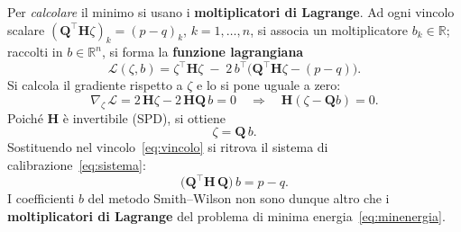 \documentclass[11pt,a4paper]{article}
\theoremstyle{plain}
\theoremstyle{definition}
\theoremstyle{remark}
\newcommand{\Qmat}{\mathbf{Q}}
\newcommand{\Hmat}{\mathbf{H}}
\newcommand{\transp}{^{\!\top}}
\begin{document}
Per \emph{calcolare} il minimo si usano i \textbf{moltiplicatori di Lagrange}.
Ad ogni vincolo scalare $(\Qmat\transp\Hmat\zeta)_k = (p-q)_k$, $k=1,\ldots,n$,
si associa un moltiplicatore $b_k\in\mathbb{R}$; raccolti in $b\in\mathbb{R}^n$, si forma la
\textbf{funzione lagrangiana}
\begin{equation}
  \mathcal{L}(\zeta,b)
  = \zeta\transp\Hmat\zeta
    \;-\; 2\,b\transp\!\bigl(\Qmat\transp\Hmat\zeta - (p-q)\bigr).
  \label{eq:lagrangiana}
\end{equation}
Si calcola il gradiente rispetto a $\zeta$ e lo si pone uguale a zero:
\[
  \nabla_\zeta\,\mathcal{L}
  = 2\,\Hmat\zeta - 2\,\Hmat\Qmat\,b = 0
  \quad\Longrightarrow\quad
  \Hmat(\zeta - \Qmat b) = 0.
\]
Poich\'e $\Hmat$ \`e invertibile (SPD), si ottiene
\[
  \zeta = \Qmat\, b .
\]
Sostituendo nel vincolo~\eqref{eq:vincolo} si ritrova il sistema di
calibrazione~\eqref{eq:sistema}:
\[
  \bigl(\Qmat\transp \Hmat\, \Qmat\bigr)\, b = p - q .
\]
I coefficienti $b$ del metodo Smith--Wilson non sono dunque altro che i
\textbf{moltiplicatori di Lagrange} del problema di minima energia~\eqref{eq:minenergia}.


\end{document}
